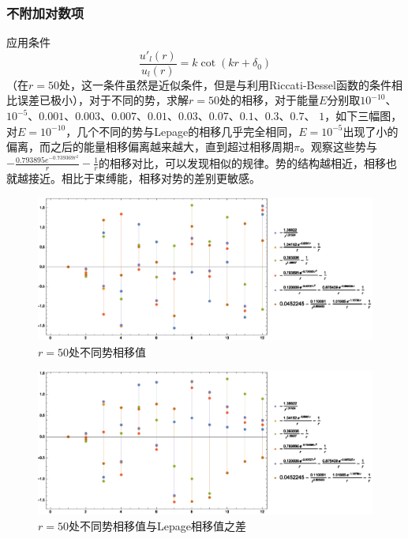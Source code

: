 \documentclass[hyperref,cs4size,titlepage,twoside]{ctexart}
\begin{document}
\subsubsection{不附加对数项}
应用条件
\begin{equation}\label{pscondition}
  \frac{u'_l(r)}{u_l(r)}=k\cot(kr+\delta_0)
\end{equation}
（在$r=50$处，这一条件虽然是近似条件，但是与利用Riccati-Bessel函数的条件相比误差已极小），对于不同的势，求解$r=50$处的相移，对于能量$E$分别取$10^{-10}$、$10^{-5}$、$0.001$、$0.003$、$0.007$、$0.01$、$0.03$、$0.07$、$0.1$、$0.3$、$0.7$、 $1$，如下三幅图，
对$E=10^{-10}$，几个不同的势与Lepage的相移几乎完全相同，$E=10^{-5}$出现了小的偏离，而之后的能量相移偏离越来越大，直到超过相移周期$\pi$。观察这些势与$\displaystyle-\frac{0.793895 e^{-0.739369 r^2}}{r}-\frac{1}{r}$的相移对比，可以发现相似的规律。势的结构越相近，相移也就越接近。相比于束缚能，相移对势的差别更敏感。
\begin{figure}[!hbtp]
  \centering
  \includegraphics[width=6in]{Test_PhaseShift_delta50comparasion.eps}
  \caption{$r=50$处不同势相移值}
\end{figure}
\begin{figure}[!hbtp]
  \centering
  \includegraphics[width=6in]{Test_PhaseShift_delta50comparasion_2.eps}
  \caption{$r=50$处不同势相移值与Lepage相移值之差}
\end{figure}
\end{document}
